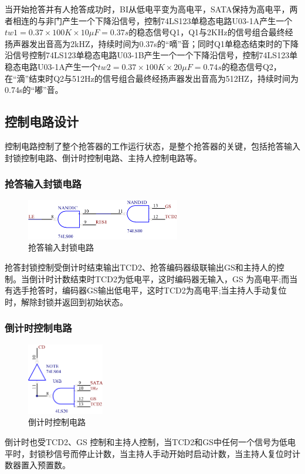 \documentclass{../source/Experiment}
\begin{document}
        当开始抢答并有人抢答成功时，BI从低电平变为高电平，SATA保持为高电平，两者相连的与非门产生一个下降沿信号，控制74LS123单稳态电路U03-1A产生一个$tw1 = 0.37\times 100K \times 10 \mu F = 0.37s$的稳态信号Q1，Q1与2KHz的信号组合最终经扬声器发出音高为2kHZ，持续时间为0.37s的“嘀”音；同时Q1单稳态结束时的下降沿信号控制74LS123单稳态电路U03-1B产生一个一个下降沿信号，控制74LS123单稳态电路U03-1A产生一个$tw2 = 0.37\times 100K \times 20 \mu F = 0.74s$的稳态信号Q2，在“滴”结束时Q2与512Hz的信号组合最终经扬声器发出音高为512HZ，持续时间为0.74s的“嘟”音。

        \subsection{控制电路设计}
        控制电路控制了整个抢答器的工作运行状态，是整个抢答器的关键，包括抢答输入封锁控制电路、倒计时控制电路、主持人控制电路等。
            \subsubsection{抢答输入封锁电路}
                \begin{figure}[H]
                    \centering
                    \includegraphics[width = 0.6\textwidth]{pic/封锁.png}
                    \caption{抢答输入封锁电路}
                \end{figure}
            抢答封锁控制受倒计时结束输出TCD2、抢答编码器级联输出GS和主持人的控制。当倒计时计数结束时TCD2为低电平，这时编码器无输入，GS 为高电平;而当有选手抢答时，编码器GS输出低电平，这时TCD2为高电平;当主持人手动复位时，解除封锁并返回到初始状态。
            \subsubsection{倒计时控制电路}
                \begin{figure}[H]
                    \centering
                    \includegraphics[width = 0.3\textwidth]{pic/倒计时.png}
                    \caption{倒计时控制电路}
                \end{figure}
            倒计时也受TCD2、GS 控制和主持人控制，当TCD2和GS中任何一个信号为低电平时，封锁秒信号而停止计数，当主持人手动开始时启动计数，当主持人复位时计数器置入预置数。
\end{document}
